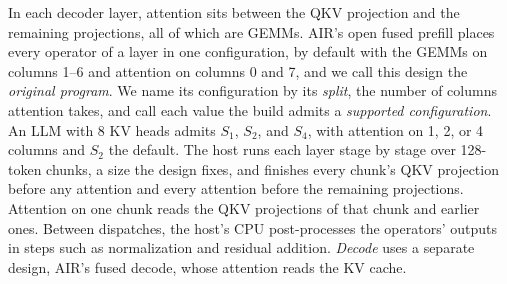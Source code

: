 In each decoder layer, attention sits between the QKV projection and the remaining projections, all of which are GEMMs.
AIR's open fused prefill places every operator of a layer in one configuration, by default with the GEMMs on columns 1--6 and attention on columns 0 and 7, and we call this design the \emph{original program}.
We name its configuration by its \emph{split}, the number of columns attention takes, and call each value the build admits a \emph{supported configuration}.
An LLM with 8 KV heads admits $S_1$, $S_2$, and $S_4$, with attention on 1, 2, or 4 columns and $S_2$ the default.
The host runs each layer stage by stage over 128-token chunks, a size the design fixes, and finishes every chunk's QKV projection before any attention and every attention before the remaining projections.
Attention on one chunk reads the QKV projections of that chunk and earlier ones.
Between dispatches, the host's CPU post-processes the operators' outputs in steps such as normalization and residual addition.
\emph{Decode} uses a separate design, AIR's fused decode, whose attention reads the KV cache.

